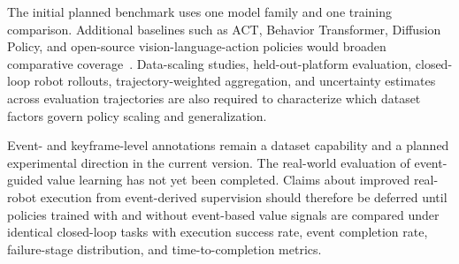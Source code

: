 The initial planned benchmark uses one model family and one training comparison. Additional baselines such as ACT, Behavior Transformer, Diffusion Policy, and open-source vision-language-action policies would broaden comparative coverage~\cite{zhao2023aloha,shafiullah2022behaviortransformer,chi2023diffusionpolicy,kim2024openvla}. Data-scaling studies, held-out-platform evaluation, closed-loop robot rollouts, trajectory-weighted aggregation, and uncertainty estimates across evaluation trajectories are also required to characterize which dataset factors govern policy scaling and generalization.

Event- and keyframe-level annotations remain a dataset capability and a planned experimental direction in the current version. The real-world evaluation of event-guided value learning has not yet been completed. Claims about improved real-robot execution from event-derived supervision should therefore be deferred until policies trained with and without event-based value signals are compared under identical closed-loop tasks with execution success rate, event completion rate, failure-stage distribution, and time-to-completion metrics.

